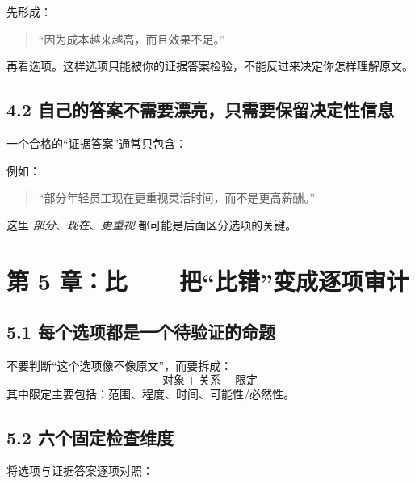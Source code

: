 \documentclass[11pt,a4paper]{ctexart}
\begin{document}
先形成：
\begin{quote}
“因为成本越来越高，而且效果不足。”
\end{quote}
再看选项。这样选项只能被你的证据答案检验，不能反过来决定你怎样理解原文。

\subsection{4.2 自己的答案不需要漂亮，只需要保留决定性信息}
一个合格的“证据答案”通常只包含：
\begin{center}
\end{center}
例如：
\begin{quote}
“部分年轻员工现在更重视灵活时间，而不是更高薪酬。”
\end{quote}
这里 \textit{部分}、\textit{现在}、\textit{更重视} 都可能是后面区分选项的关键。

\newpage
\section{第 5 章：比——把“比错”变成逐项审计}

\subsection{5.1 每个选项都是一个待验证的命题}
不要判断“这个选项像不像原文”，而要拆成：
\[
\boxed{
\text{对象}
+
\text{关系}
+
\text{限定}
}
\]
其中限定主要包括：范围、程度、时间、可能性/必然性。

\subsection{5.2 六个固定检查维度}
将选项与证据答案逐项对照：
\end{document}
